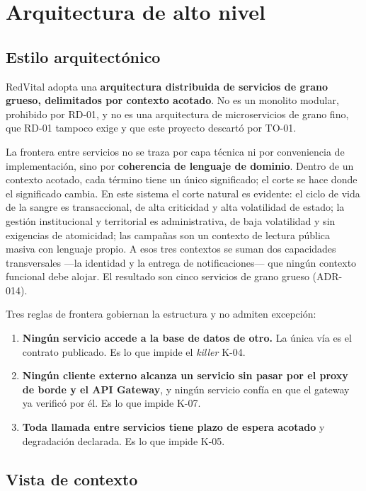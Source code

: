 \documentclass[11pt,a4paper]{article}
\begin{document}
\section{Arquitectura de alto nivel}
\label{sec:hld}

\subsection{Estilo arquitectónico}

RedVital adopta una \textbf{arquitectura distribuida de servicios de grano grueso, delimitados por contexto acotado}. No es un monolito modular, prohibido por RD-01, y no es una arquitectura de microservicios de grano fino, que RD-01 tampoco exige y que este proyecto descartó por TO-01.

La frontera entre servicios no se traza por capa técnica ni por conveniencia de implementación, sino por \textbf{coherencia de lenguaje de dominio}. Dentro de un contexto acotado, cada término tiene un único significado; el corte se hace donde el significado cambia. En este sistema el corte natural es evidente: el ciclo de vida de la sangre es transaccional, de alta criticidad y alta volatilidad de estado; la gestión institucional y territorial es administrativa, de baja volatilidad y sin exigencias de atomicidad; las campañas son un contexto de lectura pública masiva con lenguaje propio. A esos tres contextos se suman dos capacidades transversales ---la identidad y la entrega de notificaciones--- que ningún contexto funcional debe alojar. El resultado son cinco servicios de grano grueso (ADR-014).

Tres reglas de frontera gobiernan la estructura y no admiten excepción:

\begin{enumerate}
\item \textbf{Ningún servicio accede a la base de datos de otro.} La única vía es el contrato publicado. Es lo que impide el \emph{killer} K-04.
\item \textbf{Ningún cliente externo alcanza un servicio sin pasar por el proxy de borde y el API Gateway}, y ningún servicio confía en que el gateway ya verificó por él. Es lo que impide K-07.
\item \textbf{Toda llamada entre servicios tiene plazo de espera acotado} y degradación declarada. Es lo que impide K-05.
\end{enumerate}

\subsection{Vista de contexto}
\end{document}
